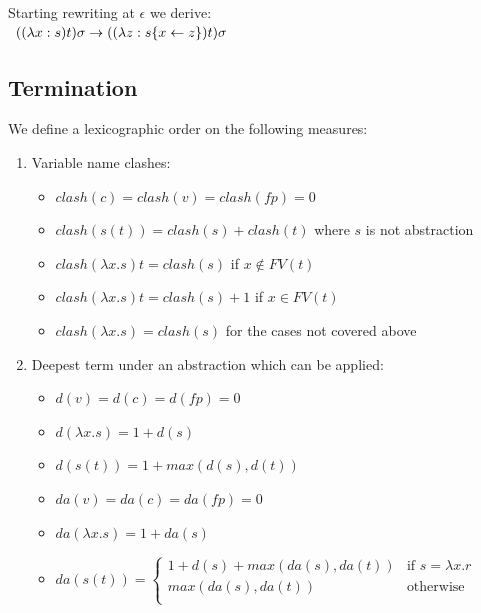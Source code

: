 \documentclass[a4paper]{article}
\newcommand{\fpsubstin}[1]{\{#1\}}
\newcommand{\fpwith}{\leftarrow}
\newcommand{\rewrites}[0]{\;\rightarrow\;}
\begin{document}
\begin{itemize}
  Starting rewriting at $\epsilon$ we derive:\\
  $
  \begin{array}{r@{\rewrites}l}
    ((\lambda x:s)t)\sigma & ((\lambda z:s\fpsubstin{x \fpwith z})t)\sigma\\
  \end{array}
  $

\end{itemize}

\subsection{Termination}
\label{sec:termination}

We define a lexicographic order on the following measures:

\begin{enumerate}
\item Variable name clashes:
  \begin{itemize}
  \item $clash(c)=clash(v)=clash(fp)=0$
  \item $clash(s(t)) = clash(s) + clash(t)$ where $s$ is not abstraction
  \item $clash(\lambda x . s) t = clash(s)$ if $x \not \in FV(t)$
  \item $clash(\lambda x . s) t = clash(s) + 1$ if $x \in FV(t)$
  \item $clash(\lambda x . s) = clash(s)$ for the cases not covered above
  \end{itemize}

\item Deepest term under an abstraction which can be applied:
  \begin{itemize}
  \item $d(v)=d(c)=d(fp)=0$
  \item $d(\lambda x . s)=1 + d(s)$
  \item $d(s(t))= 1 + max(d(s), d(t))$
  \end{itemize}

  \begin{itemize}
  \item $da(v)=da(c)=da(fp)=0$
  \item $da(\lambda x . s)=1 + da(s)$
  \item $da(s(t))= \left\{
      \begin{array}{rl}
        1 + d(s) + max(da(s),da(t))&\mbox{if }s=\lambda x.r\\
        max(da(s),da(t))&\mbox{otherwise}\\
      \end{array}\right.$
  \end{itemize}

\end{enumerate}
\end{document}
